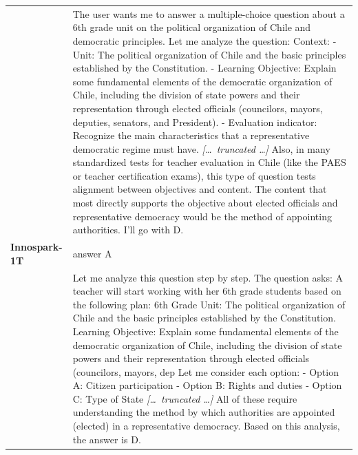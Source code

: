 \begin{longtable}{@{}l p{12.5cm}@{}}
  & The user wants me to answer a multiple-choice question about a 6th grade unit on the political organization of Chile and democratic principles. \newline Let me analyze the question: \newline Context: \newline - Unit: The political organization of Chile and the basic principles established by the Constitution. \newline - Learning Objective: Explain some fundamental elements of the democratic organization of Chile, including the division of state powers and their representation through elected officials (councilors, mayors, deputies, senators, and President). \newline - Evaluation indicator: Recognize the main characteristics that a representative democratic regime must have. \newline \textit{[\ldots\ truncated \ldots]} \newline Also, in many standardized tests for teacher evaluation in Chile (like the PAES or teacher certification exams), this type of question tests alignment between objectives and content. The content that most directly supports the objective about elected officials and representative democracy would be the method of appointing authorities. \newline I'll go with D. \\
  \textbf{Innospark-1T} & answer A \\
  & Let me analyze this question step by step. \newline The question asks: A teacher will start working with her 6th grade students based on the following plan: 6th Grade Unit: The political organization of Chile and the basic principles established by the Constitution. Learning Objective: Explain some fundamental elements of the democratic organization of Chile, including the division of state powers and their representation through elected officials (councilors, mayors, dep \newline Let me consider each option: \newline - Option A: Citizen participation \newline - Option B: Rights and duties \newline - Option C: Type of State \newline \textit{[\ldots\ truncated \ldots]} \newline All of these require understanding the method by which authorities are appointed (elected) in a representative democracy. \newline Based on this analysis, the answer is D. \\

\end{longtable}
